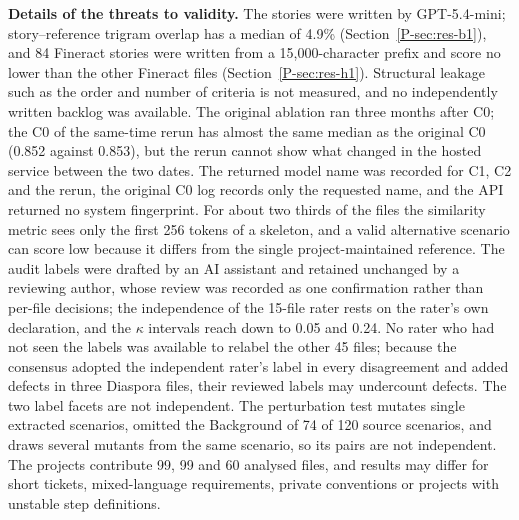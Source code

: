 \textbf{Details of the threats to validity.} The stories were written by GPT-5.4-mini; story--reference trigram overlap has a median of 4.9\% (Section~\ref{P-sec:res-b1}), and 84 Fineract stories were written from a 15,000-character prefix and score no lower than the other Fineract files (Section~\ref{P-sec:res-h1}). Structural leakage such as the order and number of criteria is not measured, and no independently written backlog was available. The original ablation ran three months after C0; the C0 of the same-time rerun has almost the same median as the original C0 (0.852 against 0.853), but the rerun cannot show what changed in the hosted service between the two dates. The returned model name was recorded for C1, C2 and the rerun, the original C0 log records only the requested name, and the API returned no system fingerprint. For about two thirds of the files the similarity metric sees only the first 256 tokens of a skeleton, and a valid alternative scenario can score low because it differs from the single project-maintained reference. The audit labels were drafted by an AI assistant and retained unchanged by a reviewing author, whose review was recorded as one confirmation rather than per-file decisions; the independence of the 15-file rater rests on the rater's own declaration, and the $\kappa$ intervals reach down to 0.05 and 0.24. No rater who had not seen the labels was available to relabel the other 45 files; because the consensus adopted the independent rater's label in every disagreement and added defects in three Diaspora files, their reviewed labels may undercount defects. The two label facets are not independent. The perturbation test mutates single extracted scenarios, omitted the Background of 74 of 120 source scenarios, and draws several mutants from the same scenario, so its pairs are not independent. The projects contribute 99, 99 and 60 analysed files, and results may differ for short tickets, mixed-language requirements, private conventions or projects with unstable step definitions.
